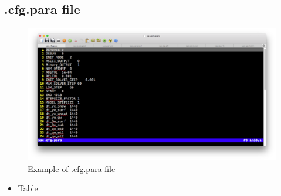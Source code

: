 \documentclass[
]{scrbook}
\providecommand{\tightlist}{%
  \setlength{\itemsep}{0pt}\setlength{\parskip}{0pt}}
\begin{document}
\hypertarget{cfg.para-file}{%
\subsection{.cfg.para file}\label{cfg.para-file}}

\begin{figure}
\centering
\includegraphics{Fig/IO/cfg.para.png}
\caption{Example of .cfg.para file}
\end{figure}

\begin{itemize}
\tightlist
\item
  Table
\end{itemize}
\end{document}
